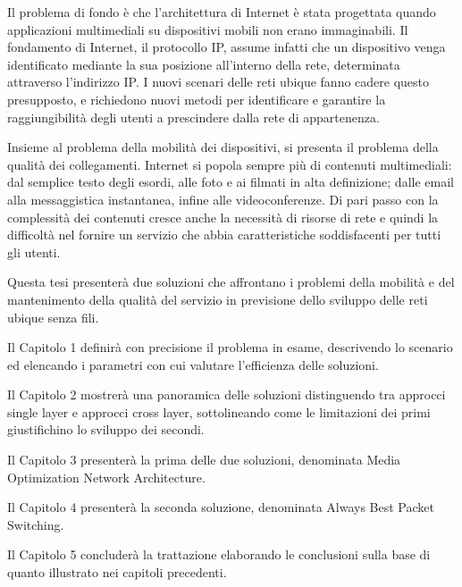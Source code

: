 \documentclass[12pt,a4paper,openright,twoside]{book}
\begin{document}
Il problema di fondo è che l'architettura di Internet è stata
progettata quando applicazioni multimediali su dispositivi mobili non
erano immaginabili. Il fondamento di Internet, il protocollo IP,
assume infatti che un dispositivo venga identificato mediante la sua
posizione all'interno della rete, determinata attraverso l'indirizzo
IP. I nuovi scenari delle reti ubique fanno cadere questo presupposto,
e richiedono nuovi metodi per identificare e garantire la
raggiungibilità degli utenti a prescindere dalla rete di appartenenza.

Insieme al problema della mobilità dei dispositivi, si presenta il
problema della qualità dei collegamenti. Internet si popola sempre più
di contenuti multimediali: dal semplice testo degli esordi, alle foto
e ai filmati in alta definizione; dalle email alla messaggistica
instantanea, infine alle videoconferenze. Di pari passo con la
complessità dei contenuti cresce anche la necessità di risorse di rete
e quindi la difficoltà nel fornire un servizio che abbia
caratteristiche soddisfacenti per tutti gli utenti.

Questa tesi presenterà due soluzioni che affrontano i problemi della
mobilità e del mantenimento della qualità del servizio in previsione
dello sviluppo delle reti ubique senza fili.

Il Capitolo 1 definirà con precisione il problema in esame,
descrivendo lo scenario ed elencando i parametri con cui valutare
l'efficienza delle soluzioni.

Il Capitolo 2 mostrerà una panoramica delle soluzioni distinguendo tra
approcci single layer e approcci cross layer, sottolineando come le
limitazioni dei primi giustifichino lo sviluppo dei secondi.

Il Capitolo 3 presenterà la prima delle due soluzioni, denominata
Media Optimization Network Architecture.

Il Capitolo 4 presenterà la seconda soluzione, denominata Always Best
Packet Switching.

Il Capitolo 5 concluderà la trattazione elaborando le conclusioni
sulla base di quanto illustrato nei capitoli precedenti.

\clearpage{\pagestyle{empty}\cleardoublepage}

\tableofcontents
\rhead[\fancyplain{}{\bfseries\leftmark}]{\fancyplain{}{\bfseries\thepage}}
\clearpage{\pagestyle{empty}\cleardoublepage}
\end{document}
